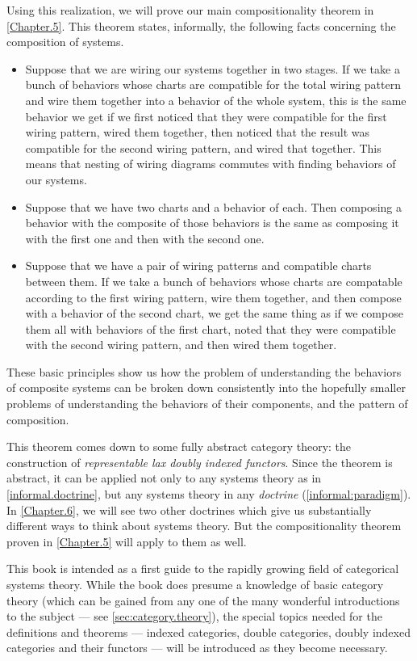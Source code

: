 \documentclass[DynamicalBook]{subfiles}
\begin{document}
Using this realization, we will prove our main compositionality theorem in \cref{Chapter.5}. This theorem states, informally, the following facts concerning the composition of systems.
\begin{itemize}
  \item Suppose that we are wiring
    our systems together in two stages. If we take a
    bunch of behaviors whose charts are compatible for the total wiring pattern
    and wire them together into a behavior of the whole system, this is the same
    behavior we get if we first noticed that they were compatible for the first
    wiring pattern, wired them together, then noticed that the result was
    compatible for the second wiring pattern, and wired that together. This
    means that nesting of wiring diagrams commutes with finding behaviors of our systems.
  \item Suppose that we have two
    charts and a behavior of each. Then composing a behavior with the composite of those behaviors is the same as composing
    it with the first one and then with the second one.
  \item Suppose that we have a pair of
    wiring patterns and compatible charts between them. If we
    take a bunch of behaviors whose charts are compatable according to the first
    wiring pattern, wire them together, and then compose with a behavior of the
    second chart, we get the same thing as if we compose them all with behaviors
    of the first chart, noted that they were compatible with the second wiring
    pattern, and then wired them together.
\end{itemize}

These basic principles show us how the problem of understanding the behaviors of composite systems can be broken down consistently into the hopefully smaller problems of understanding the behaviors of their components, and the pattern of composition.

This theorem comes down to some fully abstract category theory: the construction of \emph{representable lax doubly indexed functors}. Since the theorem is abstract, it can be applied not only to any systems theory as in \cref{informal.doctrine}, but any systems theory in any \emph{doctrine} (\cref{informal:paradigm}). In \cref{Chapter.6}, we will see two other doctrines which give us substantially different ways to think about systems theory. But the compositionality theorem proven in \cref{Chapter.5} will apply to them as well.

This book is intended as a first guide to the rapidly growing field of categorical systems theory. While the book does presume a knowledge of basic category theory (which can be gained from any one of the many wonderful introductions to the subject --- see \cref{sec:category.theory}), the special topics needed for the definitions and theorems --- indexed categories, double categories, doubly indexed categories and their functors --- will be introduced as they become necessary.
\end{document}
